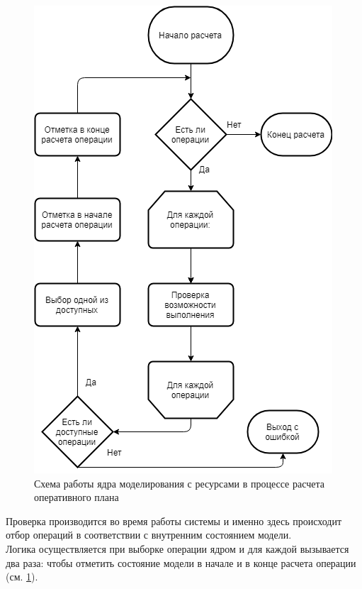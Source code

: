 \begin{figure}[h]
	\centering
	\includegraphics[scale=0.6]{pics/assemblyResSchema.png}
	\caption{Схема работы ядра моделирования с ресурсами в процессе расчета оперативного плана}
	\label{fig:assemblyResSchema}
\end{figure}

\indent Проверка производится во время работы системы и именно здесь происходит отбор операций в соответствии с внутренним состоянием модели.\\
\indent Логика осуществляется при выборке операции ядром и для каждой вызывается два раза: чтобы отметить состояние модели в начале и в конце расчета операции (см. \ref{fig:assemblyResSchema}).

